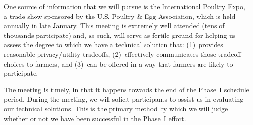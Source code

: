 One source of information that we will pursue is the International
Poultry Expo, a trade show sponsored by the U.S. Poultry \& Egg Association,
which is held annually in late January.
This meeting is extremely well attended (tens of thousands participate)
and, as such, will serve as fertile ground for helping us assess the
degree to which we have a technical solution that: (1)~provides reasonable
privacy/utility tradeoffs, (2)~effectively communicates those tradeoff
choices to farmers, and (3)~can be offered in a way that farmers are
likely to participate.

The meeting is timely, in that it happens towards the end of the
Phase~I schedule period. During the meeting, we will solicit
participants to assist us in evaluating our technical solutions.
This is the primary method by which
we will judge whether or not we have been successful
in the Phase~I effort.

